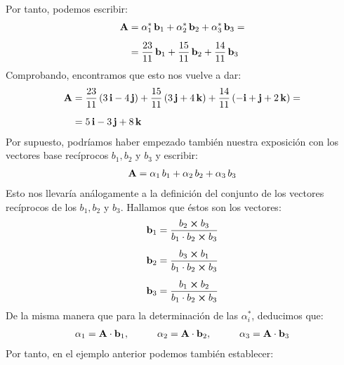 \documentclass[12pt]{article}
\begin{document}
Por tanto, podemos escribir:
\begin{eqnarray*}
\begin{aligned}
\vb{A} &= \alpha_{1}^{*} \, \vb{b}_{1} + \alpha_{2}^{*} \, \vb{b}_{2} + \alpha_{3}^{*} \, \vb{b}_{3} = \\[0.5em]
&= \dfrac{23}{11} \, \vb{b}_{1} + \dfrac{15}{11} \, \vb{b}_{2} + \dfrac{14}{11} \, \vb{b}_{3}
\end{aligned}
\end{eqnarray*}
Comprobando, encontramos que esto nos vuelve a dar:
\begin{eqnarray*}
\begin{aligned}
\vb{A} &= \dfrac{23}{11} \left( 3 \, \vb{i} - 4 \, \vb{j} \right) + \dfrac{15}{11} \left( 3 \, \vb{j} + 4 \, \vb{k} \right) + \dfrac{14}{11} \left( -\vb{i} + \vb{j} + 2 \, \vb{k} \right) = \\[0.5em]
&= 5 \, \vb{i} - 3 \, \vb{j} + 8 \, \vb{k}
\end{aligned}
\end{eqnarray*}
Por supuesto, podríamos haber empezado también nuestra exposición con los vectores base recíprocos $b_{1}, b_{2}$ y $b_{3}$ y escribir:
\begin{align}
    \vb{A} = \alpha_{1} \, b_{1} + \alpha_{2} \, b_{2} + \alpha_{3} \, b_{3}
    \label{eq:ecuacion_01_42}
\end{align}
Esto nos llevaría análogamente a la definición del conjunto de los vectores recíprocos de los $b_{1}, b_{2}$ y $b_{3}$. Hallamos que éstos son los vectores:
\begin{align}
\begin{aligned}
    \vb{b}_{1} &= \dfrac{b_{2} \cp b_{3} }{b_{1} \cdot b_{2} \cp b_{3} } \\[0.5em]
    \vb{b}_{2} &= \dfrac{b_{3} \cp b_{1}}{b_{1} \cdot b_{2} \cp b_{3} } \\[0.5em]
    \vb{b}_{3} &= \dfrac{b_{1} \cp b_{2}}{b_{1} \cdot b_{2} \cp b_{3} }
\end{aligned}
\label{eq:ecuacion_01_43}
\end{align}
De la misma manera que para la determinación de las $\alpha_{i}^{*}$, deducimos que:
\begin{align}
    \alpha_{1} = \vb{A} \cdot \vb{b}_{1}, \hspace{1cm} \alpha_{2} = \vb{A} \cdot \vb{b}_{2}, \hspace{1cm} \alpha_{3} = \vb{A} \cdot \vb{b}_{3}
    \label{eq:ecuacion_01_44}
\end{align}
Por tanto, en el ejemplo anterior podemos también establecer:
\end{document}
